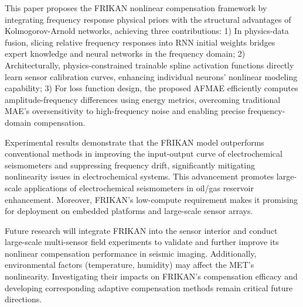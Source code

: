 \documentclass[journal]{IEEEtran}
\begin{document}
This paper proposes the FRIKAN nonlinear compensation framework by integrating frequency response physical priors with the structural advantages of Kolmogorov-Arnold networks, achieving three contributions: 1) In physics-data fusion, slicing relative frequency responses into RNN initial weights bridges expert knowledge and neural networks in the frequency domain; 2) Architecturally, physics-constrained trainable spline activation functions directly learn sensor calibration curves, enhancing individual neurons' nonlinear modeling capability; 3) For loss function design, the proposed AFMAE efficiently computes amplitude-frequency differences using energy metrics, overcoming traditional MAE's oversensitivity to high-frequency noise and enabling precise frequency-domain compensation.

Experimental results demonstrate that the FRIKAN model outperforms conventional methods in improving the input-output curve of electrochemical seismometers and suppressing frequency drift, significantly mitigating nonlinearity issues in electrochemical systems. This advancement promotes large-scale applications of electrochemical seismometers in oil/gas reservoir enhancement. Moreover, FRIKAN's low-compute requirement makes it promising for deployment on embedded platforms and large-scale sensor arrays.

Future research will integrate FRIKAN into the sensor interior and conduct large-scale multi-sensor field experiments to validate and further improve its nonlinear compensation performance in seismic imaging. Additionally, environmental factors (temperature, humidity) may affect the MET's nonlinearity. Investigating their impacts on FRIKAN's compensation efficacy and developing corresponding adaptive compensation methods remain critical future directions.



\end{document}
